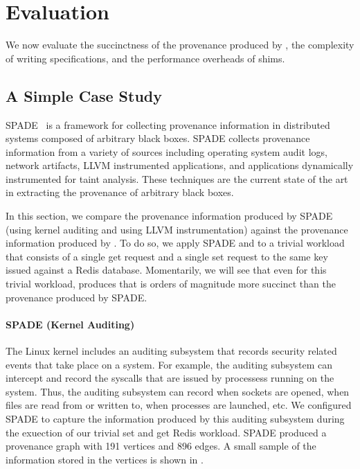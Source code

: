 \section{Evaluation}
We now evaluate the succinctness of the provenance produced by \fluent{}, the
complexity of writing \watprovenance{} specifications, and the performance
overheads of \fluent{} shims.

\subsection{A Simple Case Study}
SPADE~\cite{gehani2012spade} is a framework for collecting provenance
information in distributed systems composed of arbitrary black boxes. SPADE
collects provenance information from a variety of sources including operating
system audit logs, network artifacts, LLVM instrumented applications, and
applications dynamically instrumented for taint analysis. These techniques are
the current state of the art in extracting the provenance of arbitrary black
boxes.

In this section, we compare the provenance information produced by SPADE (using
kernel auditing and using LLVM instrumentation) against the provenance
information produced by \fluent{}. To do so, we apply SPADE and \fluent{} to a
trivial workload that consists of a single get request and a single set request
to the same key issued against a Redis database. Momentarily, we will see that
even for this trivial workload, \fluent{} produces \watprovenance{} that is
orders of magnitude more succinct than the provenance produced by SPADE.

{}

\paragraph{SPADE (Kernel Auditing)}
The Linux kernel includes an auditing subsystem that records security related
events that take place on a system. For example, the auditing subsystem can
intercept and record the syscalls that are issued by processess running on the
system. Thus, the auditing subsystem can record when sockets are opened, when
files are read from or written to, when processes are launched, etc. We
configured SPADE to capture the information produced by this auditing subsystem
during the exuection of our trivial set and get Redis workload. SPADE produced
a provenance graph with 191 vertices and 896 edges. A small sample of the
information stored in the vertices is shown in .

